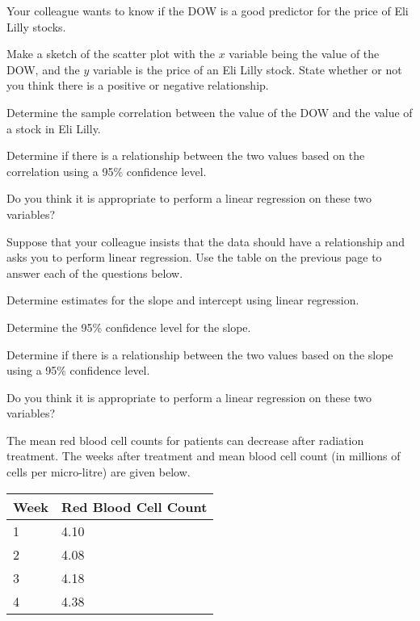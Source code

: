 \begin{problem}
\item Your colleague wants to know if the DOW is a good predictor for
  the price of Eli Lilly stocks.

  \begin{subproblem}
  \item Make a sketch of the scatter plot with the $x$ variable being
    the value of the DOW, and the $y$ variable is the price of an Eli
    Lilly stock. State whether or not you think there is a positive or
    negative relationship.
    \vfill
  \item Determine the sample correlation between the value of the DOW
    and the value of a stock in Eli Lilly. 
    \vfill
  \item Determine if there is a relationship between the two values
    based on the correlation using a 95\% confidence level.
    \vfill
  \item Do you think it is appropriate to perform a linear regression
    on these two variables?
  \end{subproblem}

\clearpage

\item Suppose that your colleague insists that the data should have a
  relationship and asks you to perform linear regression. Use the
  table on the previous page to answer each of the questions below.

  \begin{subproblem}
  \item Determine estimates for the slope and intercept using linear
    regression. 
    \vfill
  \item Determine the 95\% confidence level for the slope.
    \vfill
  \item Determine if there is a relationship between the two values
    based on the slope using a 95\% confidence level.
    \vfill
  \item Do you think it is appropriate to perform a linear regression
    on these two variables?
  \end{subproblem}

\clearpage

\item The mean red blood cell counts for patients can decrease after
  radiation treatment. The weeks after treatment and mean blood cell
  count (in millions of cells per micro-litre) are given below.

\begin{tabular}{l|l}
  Week & Red Blood Cell Count \\ \hline
  1 & 4.10 \\
  2 & 4.08 \\
  3 & 4.18 \\
  4 & 4.38
\end{tabular}


\end{problem}
